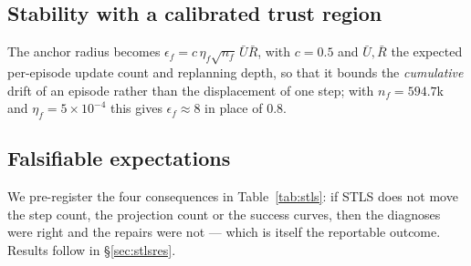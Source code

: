 \subsection{Stability with a calibrated trust region}

The anchor radius becomes $\epsilon_f=c\,\eta_f\sqrt{n_f}\,\bar U\bar R$, with $c=0.5$ and
$\bar U,\bar R$ the expected per-episode update count and replanning depth, so that it bounds the
\emph{cumulative} drift of an episode rather than the displacement of one step; with
$n_f=594.7$k and $\eta_f=5\times10^{-4}$ this gives $\epsilon_f\approx8$ in place of $0.8$.

\subsection{Falsifiable expectations}\label{sec:stlsexp}

We pre-register the four consequences in Table~\ref{tab:stls}: if STLS does not move the step
count, the projection count or the success curves, then the diagnoses were right and the repairs
were not --- which is itself the reportable outcome. Results follow in \S\ref{sec:stlsres}.
